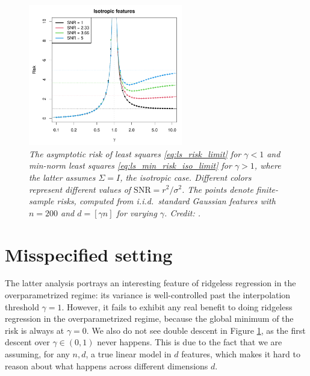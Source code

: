 \documentclass{article}
\begin{document}
\begin{figure}[htb]
\centering
\includegraphics[width=0.6\textwidth]{risk_iso.pdf}
\caption{\it The asymptotic risk of least squares \eqref{eq:ls_risk_limit} for
  $\gamma<1$ and min-norm least squares \eqref{eq:ls_min_risk_iso_limit} for
  $\gamma>1$, where the latter assumes $\Sigma = I$, the isotropic
  case. Different colors represent different values of $\mathrm{SNR} = r^2 /
  \sigma^2$. The points denote finite-sample risks, computed from i.i.d.\
  standard Gaussian features with $n=200$ and $d=[\gamma n]$ for varying
  $\gamma$. Credit: \citet{hastie2022surprises}.}  
\label{fig:risk_iso}
\end{figure}

\section{Misspecified setting}

The latter analysis portrays an interesting feature of ridgeless regression in  
the overparametrized regime: its variance is well-controlled past the
interpolation threshold $\gamma = 1$. However, it fails to exhibit any real
benefit to doing ridgeless regression in the overparametrized regime, because
the global minimum of the risk is always at $\gamma = 0$. We also do not see
double descent in Figure \ref{fig:risk_iso}, as the first descent over $\gamma
\in (0,1)$ never happens. This is due to the fact that we are assuming, for any 
$n,d$, a true linear model in $d$ features, which makes it hard to reason about
what happens across different dimensions $d$.    
\end{document}
